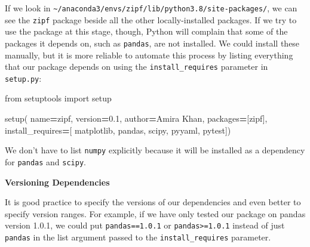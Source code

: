 \documentclass[
]{krantz}
\makeatletter
\newenvironment{Shaded}{\begin{snugshade}}{\end{snugshade}}
\newcommand{\ImportTok}[1]{#1}
\newcommand{\NormalTok}[1]{#1}
\newcommand{\OperatorTok}[1]{\textcolor[rgb]{0.81,0.36,0.00}{\textbf{#1}}}
\newcommand{\StringTok}[1]{\textcolor[rgb]{0.31,0.60,0.02}{#1}}
\renewenvironment{quote}{\begin{VF}}{\end{VF}}
\newenvironment{kframe}{%
\medskip{}
\setlength{\fboxsep}{.8em}
 \def\at@end@of@kframe{}%
 \ifinner\ifhmode%
  \def\at@end@of@kframe{\end{minipage}}%
  \begin{minipage}{\columnwidth}%
 \fi\fi%
 \def\FrameCommand##1{\hskip\@totalleftmargin \hskip-\fboxsep
 \colorbox{shadecolor}{##1}\hskip-\fboxsep
     \hskip-\linewidth \hskip-\@totalleftmargin \hskip\columnwidth}%
 \MakeFramed {\advance\hsize-\width
   \@totalleftmargin\z@ \linewidth\hsize
   \@setminipage}}%
 {\par\unskip\endMakeFramed%
 \at@end@of@kframe}
\renewenvironment{Shaded}{\begin{kframe}}{\end{kframe}}
\makeatother
\begin{document}
If we look in \texttt{\textasciitilde{}/anaconda3/envs/zipf/lib/python3.8/site-packages/},
we can see the \texttt{zipf} package beside all the other locally-installed packages.
If we try to use the package at this stage,
though,
Python will complain that some of the packages it depends on,
such as \texttt{pandas},
are not installed.
We could install these manually,
but it is more reliable to automate this process
by listing everything that our package depends on
using the \texttt{install\_requires} parameter in \texttt{setup.py}:

\begin{Shaded}
\begin{Highlighting}[]
\ImportTok{from}\NormalTok{ setuptools }\ImportTok{import}\NormalTok{ setup}


\NormalTok{setup(}
\NormalTok{    name}\OperatorTok{=}\StringTok{\textquotesingle{}zipf\textquotesingle{}}\NormalTok{,}
\NormalTok{    version}\OperatorTok{=}\StringTok{\textquotesingle{}0.1\textquotesingle{}}\NormalTok{,}
\NormalTok{    author}\OperatorTok{=}\StringTok{\textquotesingle{}Amira Khan\textquotesingle{}}\NormalTok{,}
\NormalTok{    packages}\OperatorTok{=}\NormalTok{[}\StringTok{\textquotesingle{}zipf\textquotesingle{}}\NormalTok{],}
\NormalTok{    install\_requires}\OperatorTok{=}\NormalTok{[}
        \StringTok{\textquotesingle{}matplotlib\textquotesingle{}}\NormalTok{,}
        \StringTok{\textquotesingle{}pandas\textquotesingle{}}\NormalTok{,}
        \StringTok{\textquotesingle{}scipy\textquotesingle{}}\NormalTok{,}
        \StringTok{\textquotesingle{}pyyaml\textquotesingle{}}\NormalTok{,}
        \StringTok{\textquotesingle{}pytest\textquotesingle{}}\NormalTok{])}
\end{Highlighting}
\end{Shaded}

We don't have to list \texttt{numpy} explicitly
because it will be installed as a dependency for \texttt{pandas} and \texttt{scipy}.

\begin{quote}
\textbf{Versioning Dependencies}

It is good practice to specify the versions of our dependencies
and even better to specify version ranges.
For example, if we have only tested our package on pandas version 1.0.1,
we could put \texttt{pandas==1.0.1} or \texttt{pandas\textgreater{}=1.0.1} instead of just \texttt{pandas}
in the list argument passed to the \texttt{install\_requires} parameter.
\end{quote}
\end{document}
